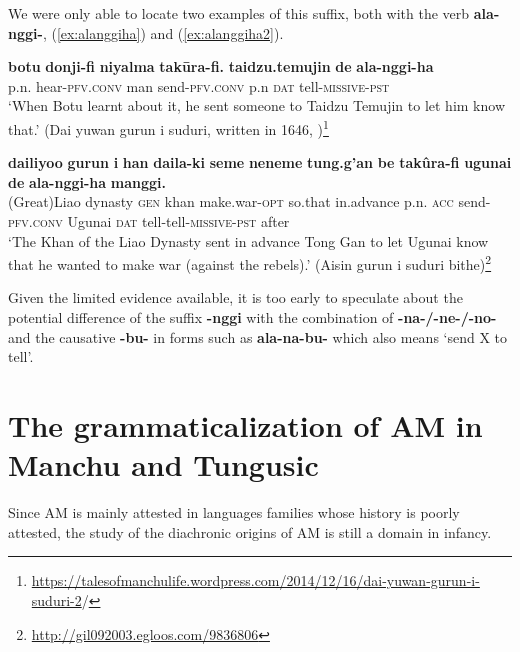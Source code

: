\documentclass{article}
\newcommand{\ipa}[1]{\textbf{{\phon\mbox{#1}}}} %
\begin{document}
We were only able to locate two examples of this suffix, both with the verb \ipa{ala-nggi-}, (\ref{ex:alanggiha}) and (\ref{ex:alanggiha2}).

\begin{exe}
\ex \label{ex:alanggiha}
\gll \ipa{botu} 	\ipa{donji-fi} 	\ipa{niyalma} 	\ipa{takūra-fi.} 	\ipa{taidzu.temujin} 	\ipa{de} 	\ipa{ala-nggi-ha} \\
p.n. hear-\textsc{pfv.conv} man send-\textsc{pfv.conv} p.n \textsc{dat} tell-\textsc{missive-pst} \\
\glt `When Botu learnt about it, he sent someone to Taidzu Temujin to let him know that.' (Dai yuwan gurun i suduri, written in 1646, \citealt[121-192]{klaproth1828chrestomathie})\footnote{
 \url{https://talesofmanchulife.wordpress.com/2014/12/16/dai-yuwan-gurun-i-suduri-2}/
}
\end{exe}


\begin{exe}
\ex \label{ex:alanggiha2}
\gll 
\ipa{dailiyoo} 	\ipa{gurun} 	\ipa{i} 	\ipa{han} 	\ipa{daila-ki} 	\ipa{seme} 	\ipa{neneme} 	\ipa{tung.g’an} 	\ipa{be} 	\ipa{takûra-fi} 	\ipa{ugunai} 	\ipa{de} 	\ipa{ala-nggi-ha} 	\ipa{manggi.} \\
(Great)Liao dynasty \textsc{gen} khan make.war-\textsc{opt} so.that in.advance p.n. \textsc{acc} send-\textsc{pfv.conv} Ugunai \textsc{dat} tell-tell-\textsc{missive-pst} after \\
\glt `The Khan of the Liao Dynasty sent in advance Tong Gan to let Ugunai know that he wanted to make war (against the rebels).' (Aisin gurun i suduri bithe)\footnote{\url{http://gil092003.egloos.com/9836806}}
\end{exe}

Given the limited evidence available, it is too early to speculate about the potential difference of the suffix \ipa{-nggi} with the combination of \ipa{-na-/-ne-/-no-} and the causative \ipa{-bu-} in forms such as \ipa{ala-na-bu-} which also means `send X to tell'.
 

 

\section{The grammaticalization of AM in Manchu and Tungusic} \label{sec:grammaticalization}
Since AM is mainly attested in languages families whose history is poorly attested, the study of the diachronic origins of AM is still a domain in infancy.
\end{document}
